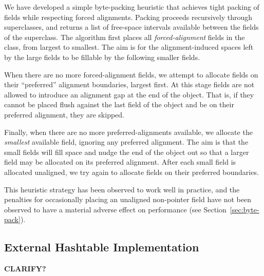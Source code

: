\documentclass[oribibl]{llncs}
\begin{document}
We have developed a simple byte-packing heuristic that achieves
tight packing of fields while respecting forced alignments.  Packing
proceeds recursively through superclasses, and returns a list of
free-space intervals available between the fields of the superclass.
The algorithm first places all {\it forced-alignment} fields in
the class, from largest to smallest.  The aim is for the
alignment-induced spaces left by the large fields to be fillable by
the following smaller fields.

When there are no more forced-alignment fields, we attempt to allocate
fields on their ``preferred'' alignment boundaries, largest first.
At this stage fields are not allowed to introduce an alignment gap at
the end of the object.  That is, if they cannot be placed flush
against the last field of the object and be on their preferred
alignment, they are skipped.

Finally, when there are no more preferred-alignments available, we
allocate the {\it smallest} available field, ignoring any preferred
alignment.  The aim is that the small fields will fill space and nudge
the end of the object out so that a larger field may be allocated on
its preferred alignment.  After each small field is allocated
unaligned, we try again to allocate fields on their preferred
boundaries.

This heuristic strategy has been observed to work well in practice,
and the penalties for occasionally placing an unaligned non-pointer
field have not
been observed to have a material adverse effect on performance (see
Section~\ref{sec:byte-pack}). 



\subsection{External Hashtable Implementation}
\label{sec:extern-impl}
\textbf{CLARIFY?}
\end{document}
